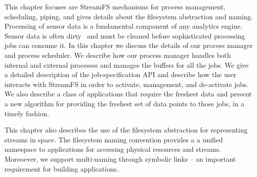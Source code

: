 


This chapter focuses are StreamFS mechanisms for process management, scheduling, piping, and gives details about
the filesystem abstraction and naming.
Processing of sensor data is a fundamental component of any analytics engine.  Sensor data is often dirty~\cite{4160603} and
must be cleaned before sophisticated processing jobs can consume it.  
In this chapter we discuss the details of our process manager and process scheduler.  We describe how our process manager handles
both internal and external processes and manages the buffers for all the jobs.  We give a detailed description of the job-specification
API and describe how the user interacts with StreamFS in order to activate, management, and de-activate jobs.  We also 
describe a class of applications that require the freshest data and present a new algorithm for providing the freshest set of data
points to those jobs, in a timely fashion.

This chapter also describes the use of the filesystem abstraction for representing streams in space.  The filesystem naming convention
provides a a unified namespace to applications for accessing physical resources and streams.  Moreoever, we support multi-naming through
symbolic links -- an important requirement for building applications. 


% 





% 


